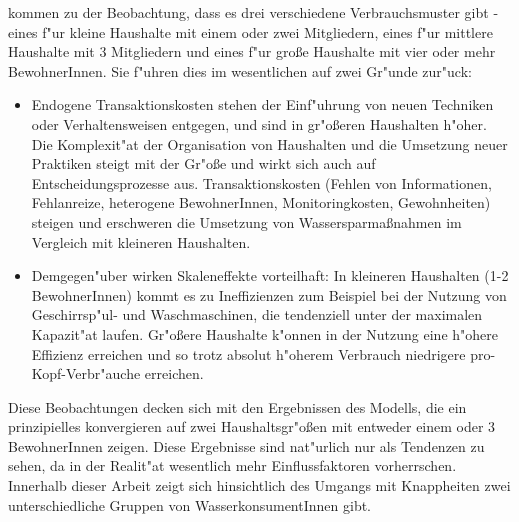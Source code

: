 \documentclass[11pt,a4paper]{article}
\begin{document}
\cite{Arbues2010} kommen zu der Beobachtung, dass es drei verschiedene Verbrauchsmuster gibt - eines f"ur kleine Haushalte mit einem oder zwei Mitgliedern, eines f"ur mittlere Haushalte mit 3 Mitgliedern und eines f"ur große Haushalte mit vier oder mehr BewohnerInnen. Sie f"uhren dies im wesentlichen auf zwei Gr"unde zur"uck:
\begin{itemize}
\item Endogene Transaktionskosten stehen der Einf"uhrung von neuen Techniken oder Verhaltensweisen entgegen, und sind in gr"oßeren Haushalten h"oher. Die Komplexit"at der Organisation von Haushalten und die Umsetzung neuer Praktiken steigt mit der Gr"oße und wirkt sich auch auf Entscheidungsprozesse aus. Transaktionskosten (Fehlen von Informationen, Fehlanreize, heterogene BewohnerInnen, Monitoringkosten, Gewohnheiten) steigen und erschweren die Umsetzung von Wassersparmaßnahmen im Vergleich mit kleineren Haushalten.
\item Demgegen"uber wirken Skaleneffekte vorteilhaft: In kleineren Haushalten (1-2 BewohnerInnen) kommt es zu Ineffizienzen zum Beispiel bei der Nutzung von Geschirrsp"ul- und Waschmaschinen, die tendenziell unter der maximalen Kapazit"at laufen. Gr"oßere Haushalte k"onnen in der Nutzung eine h"ohere Effizienz erreichen und so trotz absolut h"oherem Verbrauch niedrigere pro-Kopf-Verbr"auche erreichen.
\end{itemize}
Diese Beobachtungen decken sich mit den Ergebnissen des Modells, die ein prinzipielles konvergieren auf zwei Haushaltsgr"oßen mit entweder einem oder 3 BewohnerInnen zeigen. Diese Ergebnisse sind nat"urlich nur als Tendenzen zu sehen, da in der Realit"at wesentlich mehr Einflussfaktoren vorherrschen. Innerhalb dieser Arbeit zeigt sich hinsichtlich des Umgangs mit Knappheiten zwei unterschiedliche Gruppen von WasserkonsumentInnen gibt.\\
\end{document}

